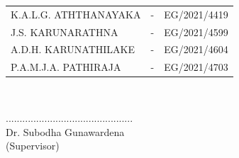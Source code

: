 \begin{center}
  \begin{tabular}[h]{lll}
      K.A.L.G. ATHTHANAYAKA 	& - & 	EG/2021/4419\\
       J.S. KARUNARATHNA	& - & 	EG/2021/4599\\
        A.D.H. KARUNATHILAKE	& - & 	EG/2021/4604\\
         P.A.M.J.A. PATHIRAJA  	& - &	EG/2021/4703
          \end{tabular}\\
          \vspace{1cm}

          \vspace{1cm}

           .............................................. \\
           Dr. Subodha Gunawardena\\
           (Supervisor)






           \end{center}

           